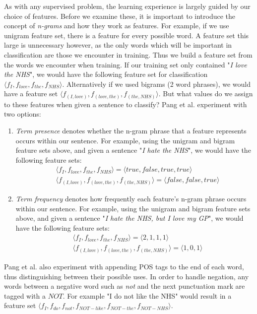 As with any supervised problem, the learning experience is largely guided by our choice of features. Before we examine these, it is important to introduce the concept of \emph{n-grams} and how they work as features. For example, if we use unigram feature set, there is a feature for every possible word. A feature set this large is unnecessary however, as the only words which will be important in classification are those we encounter in training. Thus we build a feature set from the words we encounter when training. If our training set only contained "\emph{I love the NHS}", we would have the following feature set for classification $\langle f_{I}, f_{love}, f_{the}, f_{NHS} \rangle$. Alternatively if we used bigrams (2 word phrases), we would have a feature set $\langle f_{(I,love)}, f_{(love,the)}, f_{(the,NHS)} \rangle$. But what values do we assign to these features when given a sentence to classify? Pang et al. experiment with two options:

\begin{enumerate}
	\item{\emph{Term presence} denotes whether the n-gram phrase that a feature represents occurs within our sentence. For example, using the unigram and bigram feature sets above, and given a sentence "\emph{I hate the NHS}", we would have the following feature sets:
	\begin{eqnarray} 
		& \langle f_{I}, f_{love}, f_{the}, f_{NHS} \rangle = \langle true, false, true, true \rangle \nonumber \\
		& \langle f_{(I,love)}, f_{(love,the)}, f_{(the,NHS)} \rangle = \langle false, false, true \rangle \nonumber
	\end{eqnarray}
	}
	\item{\emph{Term frequency} denotes how frequently each feature's n-gram phrase occurs within our sentence. For example, using the unigram and bigram feature sets above, and given a sentence "\emph{I hate the NHS, but I love my GP}", we would have the following feature sets:
	\begin{eqnarray} 
		& \langle f_{I}, f_{love}, f_{the}, f_{NHS} \rangle = \langle 2, 1, 1, 1 \rangle \nonumber \\
		& \langle f_{(I,love)}, f_{(love,the)}, f_{(the,NHS)} \rangle = \langle 1, 0, 1 \rangle \nonumber
	\end{eqnarray}
	}
\end{enumerate}

Pang et al. also experiment with appending POS tags to the end of each word, thus distinguishing between their possible uses. In order to handle negation, any words between a negative word such as \emph{not} and the next punctuation mark are tagged with a $NOT$. For example "I do not like the NHS" would result in a feature set $\langle f_{I}, f_{do}, f_{not}, f_{NOT-like}, f_{NOT-the}, f_{NOT-NHS} \rangle$. 

